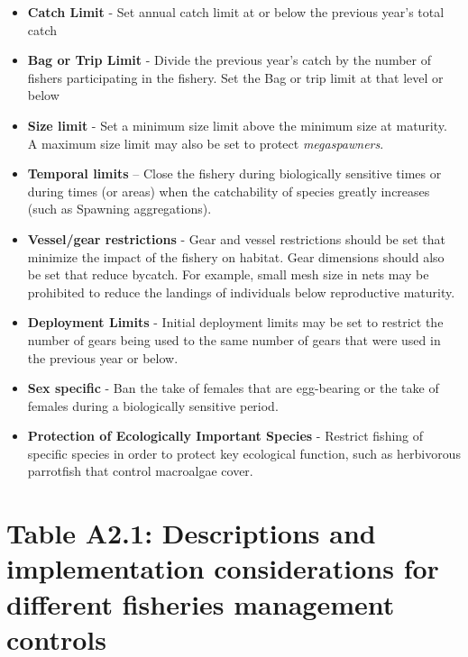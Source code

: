 \documentclass[]{book}
\begin{document}
\begin{itemize}
\item
  \textbf{Catch Limit} - Set annual catch limit at or below the previous
  year's total catch
\item
  \textbf{Bag or Trip Limit} - Divide the previous year's catch by the
  number of fishers participating in the fishery. Set the Bag or trip
  limit at that level or below
\item
  \textbf{Size limit} - Set a minimum size limit above the minimum size
  at maturity. A maximum size limit may also be set to protect
  \emph{megaspawners}.
\item
  \textbf{Temporal limits} -- Close the fishery during biologically
  sensitive times or during times (or areas) when the catchability of
  species greatly increases (such as Spawning aggregations).
\item
  \textbf{Vessel/gear restrictions} - Gear and vessel restrictions
  should be set that minimize the impact of the fishery on habitat. Gear
  dimensions should also be set that reduce bycatch. For example, small
  mesh size in nets may be prohibited to reduce the landings of
  individuals below reproductive maturity.
\item
  \textbf{Deployment Limits} - Initial deployment limits may be set to
  restrict the number of gears being used to the same number of gears
  that were used in the previous year or below.
\item
  \textbf{Sex specific} - Ban the take of females that are egg-bearing
  or the take of females during a biologically sensitive period.
\item
  \textbf{Protection of Ecologically Important Species} - Restrict
  fishing of specific species in order to protect key ecological
  function, such as herbivorous parrotfish that control macroalgae
  cover.
\end{itemize}

\section{Table A2.1: Descriptions and implementation considerations for
different fisheries management
controls}\label{table-a2.1-descriptions-and-implementation-considerations-for-different-fisheries-management-controls}
\end{document}
